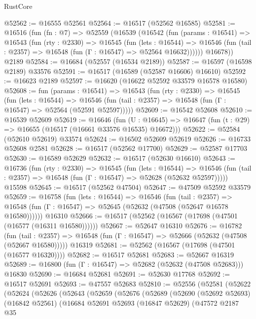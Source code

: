 \begin{lexlean}{RustCore}
\begin{coremodule}
@52562 := @16555 @52561
@52564 := @16517 (@52562 @16585)
@52581 := @16516
    (fun (fn : @7) =>
    @52559
      (@16539
        (@16542
          (fun (params : @16541) =>
          @16543
            (fun (rty : @2330) =>
            @16545
              (fun (lets : @16544) =>
              @16546 (fun (tail : @2357) => @16548 (fun (Γ : @16547) => @52564 @16632))))))
        @16678))
    @2189
@52584 := @16684 (@52557 (@16534 @2189))
@52587 := @16597 (@16598 @2189) @33576
@52591 := @16517 (@16589 (@52587 @16606) @16610)
@52592 := @16623 @2189
@52597 := @16620 (@16622 @52592 @33579 @16578 @16580)
@52608 := fun (params : @16541) =>
  @16543
    (fun (rty : @2330) =>
    @16545
      (fun (lets : @16544) =>
      @16546 (fun (tail : @2357) => @16548 (fun (Γ : @16547) => @52564 (@52591 @52597)))))
@52609 := @16542 @52608
@52610 := @16539 @52609
@52619 := @16646
    (fun (U : @16645) => @16647 (fun (t : @29) => @16655 (@16517 (@16661 @33576 @16535) @16672)))
@52622 := @52584 (@52610 @52619) @33574
@52624 := @16502 @52609 @52619
@52626 := @16733 @52608 @2581
@52628 := @16517 (@52562 @17700)
@52629 := @52587 @17703
@52630 := @16589 @52629
@52632 := @16517 (@52630 @16610)
@52643 := @16736
    (fun (rty : @2330) =>
    @16545
      (fun (lets : @16544) =>
      @16546 (fun (tail : @2357) => @16548 (fun (Γ : @16547) => @52628 (@52632 @52597)))))
    @15598
@52645 := @16517 (@52562 @47504)
@52647 := @47509 @52592 @33579
@52659 := @16758
    (fun (lets : @16544) =>
    @16546
      (fun (tail : @2357) =>
      @16548 (fun (Γ : @16547) => @52645 (@52632 (@47508 (@52647 @16578 @16580))))))
    @16310
@52666 := @16517 (@52562 (@16567 (@17698 (@47501 (@16577 (@16311 @16580))))))
@52667 := @52647 @16310
@52676 := @16782
    (fun (tail : @2357) => @16548 (fun (Γ : @16547) => @52666 (@52632 (@47508 (@52667 @16580)))))
    @16319
@52681 := @52562 (@16567 (@17698 (@47501 (@16577 @16320))))
@52682 := @16517 @52681
@52683 := @52667 @16319
@52689 := @16800 (fun (Γ : @16547) => @52682 (@52632 (@47508 @52683))) @16830
@52690 := @16684 @52681
@52691 := @52630 @17768
@52692 := @16517 @52691
@52693 := @47557 @52683
@52810 := @52556
    (@52581
      (@52622
        (@52624
          (@52626
            (@52643
              (@52659
                (@52676
                  (@52689
                    (@52690
                      (@52692 @52693)
                      (@16842 @52561)
                      (@16684
                        @52691
                        @52693
                        (@16847 @52629)
                        (@47572
                          @2187
                          @35

\end{coremodule}
\end{lexlean}
